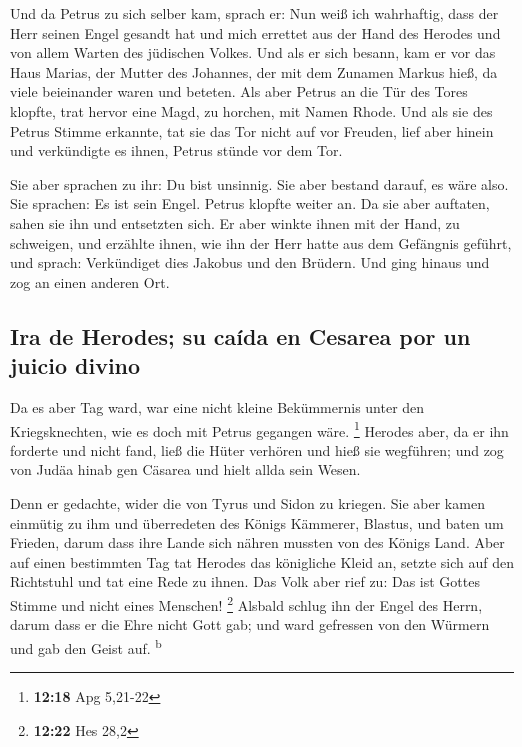  Und da Petrus zu sich selber kam, sprach er: Nun weiß
ich wahrhaftig, dass der Herr seinen Engel gesandt hat und mich errettet
aus der Hand des Herodes und von allem Warten des jüdischen Volkes.
 Und als er sich besann, kam er vor das Haus Marias, der
Mutter des Johannes, der mit dem Zunamen Markus hieß, da viele
beieinander waren und beteten.  Als aber Petrus an die
Tür des Tores klopfte, trat hervor eine Magd, zu horchen, mit Namen
Rhode.  Und als sie des Petrus Stimme erkannte, tat sie
das Tor nicht auf vor Freuden, lief aber hinein und verkündigte es
ihnen, Petrus stünde vor dem Tor.

 Sie aber sprachen zu ihr: Du bist unsinnig. Sie aber
bestand darauf, es wäre also. Sie sprachen: Es ist sein Engel.
 Petrus klopfte weiter an. Da sie aber auftaten, sahen
sie ihn und entsetzten sich.  Er aber winkte ihnen mit
der Hand, zu schweigen, und erzählte ihnen, wie ihn der Herr hatte aus
dem Gefängnis geführt, und sprach: Verkündiget dies Jakobus und den
Brüdern. Und ging hinaus und zog an einen anderen Ort.

\hypertarget{ira-de-herodes-su-cauxedda-en-cesarea-por-un-juicio-divino}{%
\subsection{Ira de Herodes; su caída en Cesarea por un juicio
divino}\label{ira-de-herodes-su-cauxedda-en-cesarea-por-un-juicio-divino}}

 Da es aber Tag ward, war eine nicht kleine Bekümmernis
unter den Kriegsknechten, wie es doch mit Petrus gegangen wäre.
\footnote{\textbf{12:18} Apg 5,21-22}  Herodes aber, da
er ihn forderte und nicht fand, ließ die Hüter verhören und hieß sie
wegführen; und zog von Judäa hinab gen Cäsarea und hielt allda sein
Wesen.

 Denn er gedachte, wider die von Tyrus und Sidon zu
kriegen. Sie aber kamen einmütig zu ihm und überredeten des Königs
Kämmerer, Blastus, und baten um Frieden, darum dass ihre Lande sich
nähren mussten von des Königs Land.  Aber auf einen
bestimmten Tag tat Herodes das königliche Kleid an, setzte sich auf den
Richtstuhl und tat eine Rede zu ihnen.  Das Volk aber
rief zu: Das ist Gottes Stimme und nicht eines Menschen! \footnote{\textbf{12:22}
  Hes 28,2}  Alsbald schlug ihn der Engel des Herrn,
darum dass er die Ehre nicht Gott gab; und ward gefressen von den
Würmern und gab den Geist auf. \textsuperscript{b}


